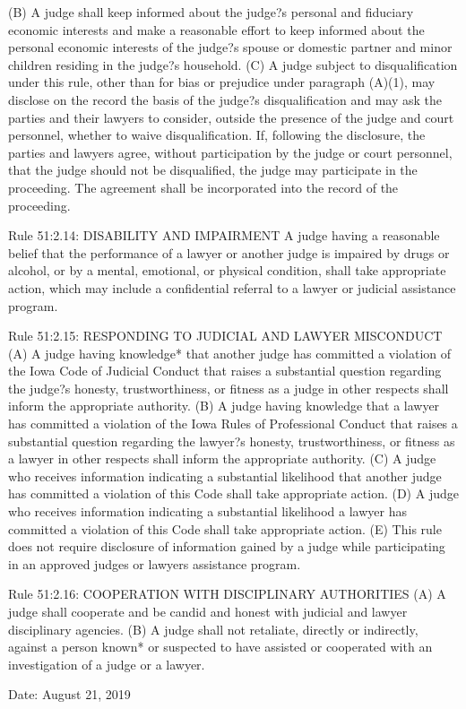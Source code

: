 \documentclass[12pt,\documentclassflag]{complaint}
\begin{document}
\begin{enumerate}
(B) A judge shall keep informed about the judge?s personal and fiduciary economic interests
and make a reasonable effort to keep informed about the personal economic interests of the judge?s spouse or domestic partner and minor children residing in the judge?s household.
(C) A judge subject to disqualification under this rule, other than for bias or prejudice under paragraph (A)(1), may disclose on the record the basis of the judge?s disqualification and may ask the parties and their lawyers to consider, outside the presence of the judge and court personnel, whether to waive disqualification. If, following the disclosure, the parties and lawyers agree, without participation by the judge or court personnel, that the judge should not be disqualified, the judge may participate in the proceeding. The agreement shall be incorporated into the record of the proceeding.

Rule 51:2.14: DISABILITY AND IMPAIRMENT
A judge having a reasonable belief that the performance of a lawyer or another judge is impaired by drugs or alcohol, or by a mental, emotional, or physical condition, shall take appropriate action, which may include a confidential referral to a lawyer or judicial assistance program.

Rule 51:2.15: RESPONDING TO JUDICIAL AND LAWYER MISCONDUCT
(A) A judge having knowledge* that another judge has committed a violation of the Iowa Code of Judicial Conduct that raises a substantial question regarding the judge?s honesty, trustworthiness, or fitness as a judge in other respects shall inform the appropriate authority.
(B) A judge having knowledge that a lawyer has committed a violation of the Iowa Rules of Professional Conduct that raises a substantial question regarding the lawyer?s honesty, trustworthiness, or fitness as a lawyer in other respects shall inform the appropriate authority.
(C) A judge who receives information indicating a substantial likelihood that another judge has committed a violation of this Code shall take appropriate action.
(D) A judge who receives information indicating a substantial likelihood a lawyer has committed a violation of this Code shall take appropriate action.
(E) This rule does not require disclosure of information gained by a judge while participating in an approved judges or lawyers assistance program.


Rule 51:2.16: COOPERATION WITH DISCIPLINARY AUTHORITIES
(A) A judge shall cooperate and be candid and honest with judicial and lawyer disciplinary agencies.
(B) A judge shall not retaliate, directly or indirectly, against a person known* or suspected to have assisted or cooperated with an investigation of a judge or a lawyer.

\end{enumerate}
Date: August 21, 2019
\end{document}
